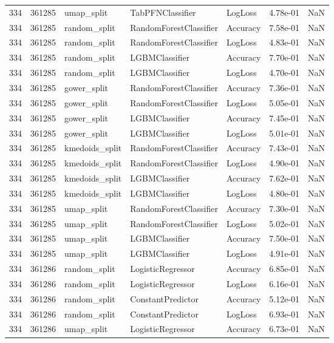 \begin{tabular}{rrlllrr}
334 & 361285 & umap\_split & TabPFNClassifier & LogLoss & 4.78e-01 & NaN \\
334 & 361285 & random\_split & RandomForestClassifier & Accuracy & 7.58e-01 & NaN \\
334 & 361285 & random\_split & RandomForestClassifier & LogLoss & 4.83e-01 & NaN \\
334 & 361285 & random\_split & LGBMClassifier & Accuracy & 7.70e-01 & NaN \\
334 & 361285 & random\_split & LGBMClassifier & LogLoss & 4.70e-01 & NaN \\
334 & 361285 & gower\_split & RandomForestClassifier & Accuracy & 7.36e-01 & NaN \\
334 & 361285 & gower\_split & RandomForestClassifier & LogLoss & 5.05e-01 & NaN \\
334 & 361285 & gower\_split & LGBMClassifier & Accuracy & 7.45e-01 & NaN \\
334 & 361285 & gower\_split & LGBMClassifier & LogLoss & 5.01e-01 & NaN \\
334 & 361285 & kmedoids\_split & RandomForestClassifier & Accuracy & 7.43e-01 & NaN \\
334 & 361285 & kmedoids\_split & RandomForestClassifier & LogLoss & 4.90e-01 & NaN \\
334 & 361285 & kmedoids\_split & LGBMClassifier & Accuracy & 7.62e-01 & NaN \\
334 & 361285 & kmedoids\_split & LGBMClassifier & LogLoss & 4.80e-01 & NaN \\
334 & 361285 & umap\_split & RandomForestClassifier & Accuracy & 7.30e-01 & NaN \\
334 & 361285 & umap\_split & RandomForestClassifier & LogLoss & 5.02e-01 & NaN \\
334 & 361285 & umap\_split & LGBMClassifier & Accuracy & 7.50e-01 & NaN \\
334 & 361285 & umap\_split & LGBMClassifier & LogLoss & 4.91e-01 & NaN \\
334 & 361286 & random\_split & LogisticRegressor & Accuracy & 6.85e-01 & NaN \\
334 & 361286 & random\_split & LogisticRegressor & LogLoss & 6.16e-01 & NaN \\
334 & 361286 & random\_split & ConstantPredictor & Accuracy & 5.12e-01 & NaN \\
334 & 361286 & random\_split & ConstantPredictor & LogLoss & 6.93e-01 & NaN \\
334 & 361286 & umap\_split & LogisticRegressor & Accuracy & 6.73e-01 & NaN \\

\end{tabular}
